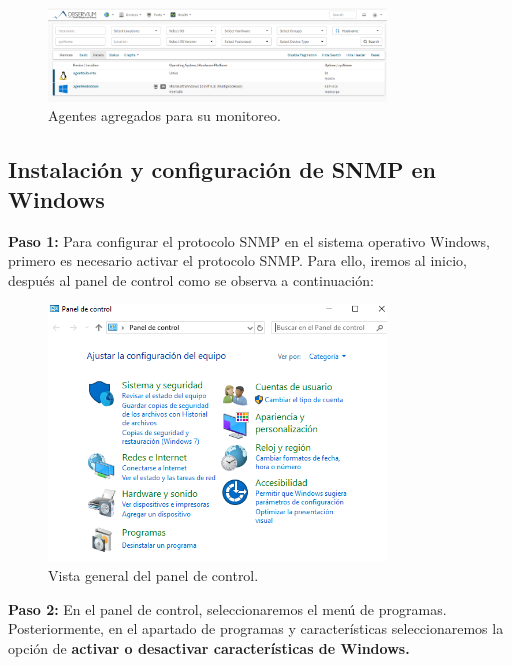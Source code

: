 \begin{figure}[htbp!]
	\centering
		\includegraphics[width=0.8\textwidth]{images/desarrollo/agregar_agente5.png}
	\caption{Agentes agregados para su monitoreo.}
\end{figure}

\pagebreak
\subsection{Instalación y configuración de SNMP en Windows}
\noindent
\newline
\textbf{Paso 1:} Para configurar el protocolo SNMP en el sistema operativo Windows, primero es necesario activar el protocolo SNMP. Para ello, iremos al inicio, después al panel de control como se observa a continuación: 

\begin{figure}[htbp!]
	\centering
		\includegraphics[width=0.8\textwidth]{images/desarrollo/configuracion_windows1.png}
	\caption{Vista general del panel de control.}
\end{figure}

\pagebreak
\noindent
\textbf{Paso 2:} En el panel de control, seleccionaremos el menú de programas. Posteriormente, en el apartado de programas y características seleccionaremos la opción de \textbf{activar o desactivar características de Windows.} 

